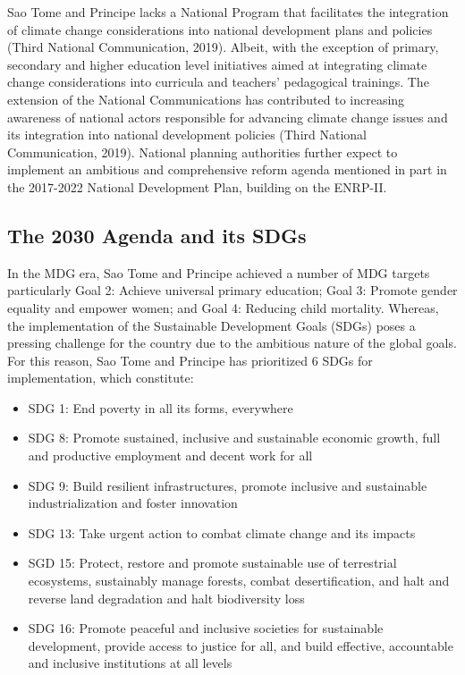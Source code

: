 \documentclass[
]{book}
\providecommand{\tightlist}{%
  \setlength{\itemsep}{0pt}\setlength{\parskip}{0pt}}
\begin{document}
Sao Tome and Principe lacks a National Program that facilitates the integration of climate change considerations into national development plans and policies (Third National Communication, 2019). Albeit, with the exception of primary, secondary and higher education level initiatives aimed at integrating climate change considerations into curricula and teachers' pedagogical trainings. The extension of the National Communications has contributed to increasing awareness of national actors responsible for advancing climate change issues and its integration into national development policies (Third National Communication, 2019). National planning authorities further expect to implement an ambitious and comprehensive reform agenda mentioned in part in the 2017-2022 National Development Plan, building on the ENRP-II.

\hypertarget{the-2030-agenda-and-its-sdgs}{%
\subsection{The 2030 Agenda and its SDGs}\label{the-2030-agenda-and-its-sdgs}}

In the MDG era, Sao Tome and Principe achieved a number of MDG targets particularly Goal 2: Achieve universal primary education; Goal 3: Promote gender equality and empower women; and Goal 4: Reducing child mortality. Whereas, the implementation of the Sustainable Development Goals (SDGs) poses a pressing challenge for the country due to the ambitious nature of the global goals. For this reason, Sao Tome and Principe has prioritized 6 SDGs for implementation, which constitute:

\begin{itemize}
\tightlist
\item
  SDG 1: End poverty in all its forms, everywhere
\item
  SDG 8: Promote sustained, inclusive and sustainable economic growth, full and productive employment and decent work for all
\item
  SDG 9: Build resilient infrastructures, promote inclusive and sustainable industrialization and foster innovation
\item
  SDG 13: Take urgent action to combat climate change and its impacts
\item
  SGD 15: Protect, restore and promote sustainable use of terrestrial ecosystems, sustainably manage forests, combat desertification, and halt and reverse land degradation and halt biodiversity loss
\item
  SDG 16: Promote peaceful and inclusive societies for sustainable development, provide access to justice for all, and build effective, accountable and inclusive institutions at all levels
\end{itemize}
\end{document}
